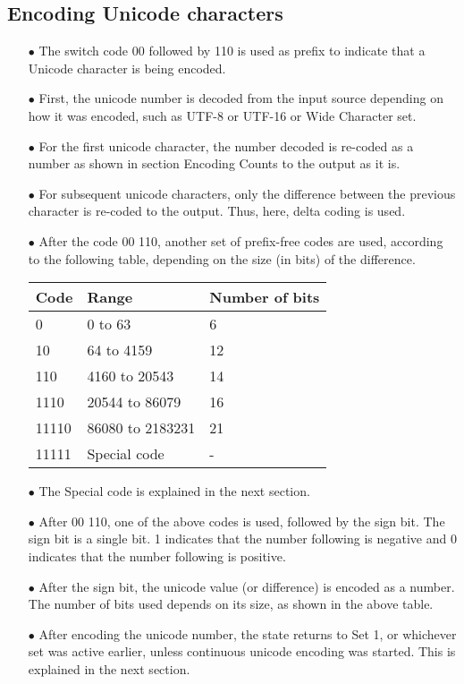 \documentclass[]{article}
\begin{document}
\subsection{Encoding Unicode characters}
\begin{itemize}
	\item[$\bullet$] The switch code 00 followed by 110 is used as prefix to indicate that a Unicode character is being encoded.
	\item[$\bullet$] First, the unicode number is decoded from the input source depending on how it was encoded, such as UTF-8 or UTF-16 or Wide Character set.
	\item[$\bullet$] For the first unicode character, the number decoded is re-coded as a number as shown in section Encoding Counts to the output as it is.
	\item[$\bullet$] For subsequent unicode characters, only the difference between the previous character is re-coded to the output.  Thus, here, delta coding is used.
	\item[$\bullet$] After the code 00 110, another set of prefix-free codes are used, according to the following table, depending on the size (in bits) of the difference.
	\item[] \begin{tabular}{ | l | l | l |} \hline
		﻿\textbf{Code} & ﻿\textbf{Range} & ﻿\textbf{Number of bits} \\ \hline
		0 & 0 to 63 & 6 \\ \hline
		10 & 64 to 4159 & 12 \\ \hline
		110 & 4160 to 20543 & 14 \\ \hline
		1110 & 20544 to 86079 & 16 \\ \hline
		11110 & 86080 to 2183231 & 21 \\ \hline
		11111 & Special code & - \\ \hline
		\end{tabular}
	\item[$\bullet$] The Special code is explained in the next section.
	\item[$\bullet$] After 00 110, one of the above codes is used, followed by the sign bit.  The sign bit is a single bit.  1 indicates that the number following is negative and 0 indicates that the number following is positive.
	\item[$\bullet$] After the sign bit, the unicode value (or difference) is encoded as a number.  The number of bits used depends on its size, as shown in the above table.
	\item[$\bullet$] After encoding the unicode number, the state returns to Set 1, or whichever set was active earlier, unless continuous unicode encoding was started.  This is explained in the next section.
\end{itemize}
\end{document}
